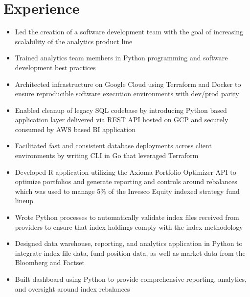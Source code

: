\documentclass[11pt,a4paper,sans]{moderncv}
\begin{document}
	\makecvtitle
	\section{Experience}
	
		
		\begin{itemize}
			
				\item Led the creation of a software development team with the goal of increasing scalability of  the analytics product line

			
				\item Trained analytics team members in Python programming and software development best practices

			
				\item Architected infrastructure on Google Cloud using Terraform and Docker to ensure  reproducible software execution environments with dev/prod parity

			
				\item Enabled cleanup of legacy SQL codebase by introducing Python based application layer delivered via  REST API hosted on GCP and securely consumed by AWS based BI application

			
				\item Facilitated fast and consistent database deployments across client environments by writing CLI  in Go that leveraged Terraform

			
		\end{itemize}
	
		
			\vspace{5mm}
		
		\begin{itemize}
			
				\item Developed R application utilizing the Axioma Portfolio Optimizer API to optimize portfolios and  generate reporting and controls around rebalances which was used to manage 5\% of the Invesco Equity  indexed strategy fund lineup

			
				\item Wrote Python processes to automatically validate index files received from providers to ensure that  index holdings comply with the index methodology

			
				\item Designed data warehouse, reporting, and analytics application in Python to integrate index file  data, fund position data, as well as market data from the Bloomberg and Factset

			
				\item Built dashboard using Python to provide comprehensive reporting, analytics, and oversight around  index rebalances

			
		\end{itemize}
	
\end{document}
